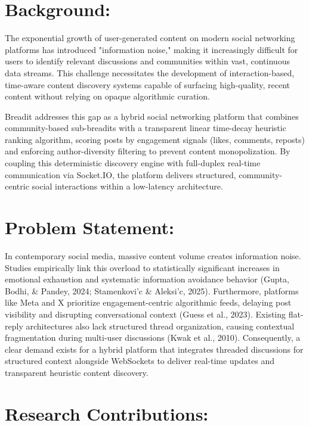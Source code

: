 
\section{Background:}

The exponential growth of user-generated content on modern social networking platforms has introduced "information noise," making it increasingly difficult for users to identify relevant discussions and communities within vast, continuous data streams. This challenge necessitates the development of interaction-based, time-aware content discovery systems capable of surfacing high-quality, recent content without relying on opaque algorithmic curation.

Breadit addresses this gap as a hybrid social networking platform that combines community-based sub-breadits with a transparent linear time-decay heuristic ranking algorithm, scoring posts by engagement signals (likes, comments, reposts) and enforcing author-diversity filtering to prevent content monopolization. By coupling this deterministic discovery engine with full-duplex real-time communication via Socket.IO, the platform delivers structured, community-centric social interactions within a low-latency architecture.

\section{Problem Statement:}

In contemporary social media, massive content volume creates information noise. Studies empirically link this overload to statistically significant increases in emotional exhaustion and systematic information avoidance behavior (Gupta, Bodhi, \& Pandey, 2024; Stamenkovi{'c} \& Aleksi{'c}, 2025). Furthermore, platforms like Meta and X prioritize engagement-centric algorithmic feeds, delaying post visibility and disrupting conversational context (Guess et al., 2023). Existing flat-reply architectures also lack structured thread organization, causing contextual fragmentation during multi-user discussions (Kwak et al., 2010). Consequently, a clear demand exists for a hybrid platform that integrates threaded discussions for structured context alongside WebSockets to deliver real-time updates and transparent heuristic content discovery.

\section{Research Contributions:}

